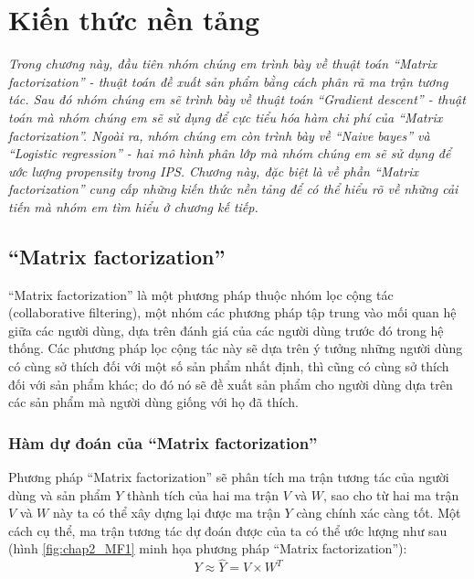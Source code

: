 \chapter{Kiến thức nền tảng}
\label{Chapter2}

\noindent \textit{Trong chương này, đầu tiên nhóm chúng em trình bày về thuật toán ``Matrix factorization'' - thuật toán đề xuất sản phẩm bằng cách phân rã ma trận tương tác. Sau đó nhóm chúng em sẽ trình bày về thuật toán ``Gradient descent'' - thuật toán mà nhóm chúng em sẽ sử dụng để cực tiểu hóa hàm chi phí của  ``Matrix factorization''. Ngoài ra, nhóm chúng em còn trình bày về ``Naive bayes'' và ``Logistic regression'' - hai mô hình phân lớp mà nhóm chúng em sẽ sử dụng để ước lượng propensity trong IPS. Chương này, đặc biệt là về phần ``Matrix factorization'' cung cấp những kiến thức nền tảng để có thể hiểu rõ về những cải tiến mà nhóm em tìm hiểu ở chương kế tiếp.}

\section{``Matrix factorization''}
\label{section:MF}
``Matrix factorization'' là một phương pháp thuộc nhóm lọc cộng tác (collaborative filtering), một nhóm các phương pháp tập trung vào mối quan hệ giữa các người dùng, dựa trên đánh giá của các người dùng trước đó trong hệ thống. Các phương pháp lọc cộng tác này sẽ dựa trên ý tưởng những người dùng có cùng sở thích đối với một số sản phẩm nhất định, thì cũng có cùng sở thích đối với sản phẩm khác; do đó nó sẽ đề xuất sản phẩm cho người dùng dựa trên các sản phẩm mà người dùng giống với họ đã thích.

\subsection{Hàm dự đoán của ``Matrix factorization''}
Phương pháp ``Matrix factorization'' sẽ phân tích ma trận tương tác của người dùng và sản phẩm $Y$ thành tích của hai ma trận $V$ và $W$, sao cho từ hai ma trận $V$ và $W$ này ta có thể xây dựng lại được ma trận $Y$ càng chính xác càng tốt. Một cách cụ thể, ma trận tương tác dự đoán được của ta có thể ước lượng như sau (hình \ref{fig:chap2_MF1} minh họa phương pháp ``Matrix factorization''):
\begin{equation}
\label{eq:2.1_MF}
    Y \approx \hat{Y} = V \times W^T
\end{equation}

